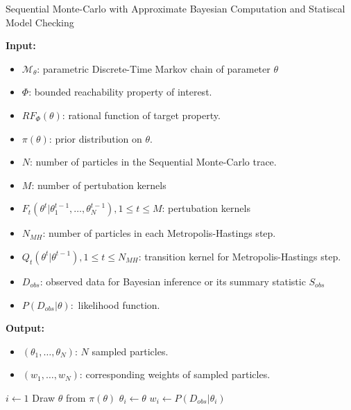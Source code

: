 \begin{algorithm}[H]
    \caption{Sequential Monte-Carlo with Approximate Bayesian Computation and Statiscal Model Checking}
    \label{smc-abc-smc-alg}
    \hspace*{\algorithmicindent} \textbf{Input:}
    \begin{itemize}
        \item $\mathcal{M}_\theta$: parametric Discrete-Time Markov chain of parameter $\theta$
        \item $\Phi$: bounded reachability property of interest.
        \item $RF_\Phi(\theta)$: rational function of target property.
        \item $\pi(\theta)$: prior distribution on $\theta$.
        \item $N$: number of particles in the Sequential Monte-Carlo trace.
        \item $M$: number of pertubation kernels
        \item $F_t(\theta^t | \theta^{t-1}_1,\ldots,\theta^{t-1}_N), 1\leq t \leq M$: pertubation kernels
        \item $N_{MH}$: number of particles in each Metropolis-Hastings step.
        \item $Q_t(\theta^t|\theta^{t-1}), 1 \leq t \leq N_{MH}$: transition kernel for Metropolis-Hastings step.
        \item $D_{obs}$: observed data for Bayesian inference or its summary statistic $S_{obs}$
        \item $P(D_{obs}|\theta):$ likelihood function.
    \end{itemize}
    \hspace*{\algorithmicindent} \textbf{Output:}
    \begin{itemize}
        \item $(\theta_1,\ldots,\theta_N)$: $N$ sampled particles.
        \item $(w_1,\ldots,w_N)$: corresponding weights of sampled particles.
    \end{itemize}
    \begin{algorithmic}[1]
        \State $i \leftarrow 1$
         
            \State Draw $\theta$ from $\pi(\theta)$
            \State $\theta_i \leftarrow \theta$
            \State $w_i \leftarrow P(D_{obs}|\theta_i)$
        \EndWhile
\end{algorithmic}
\end{algorithm}

